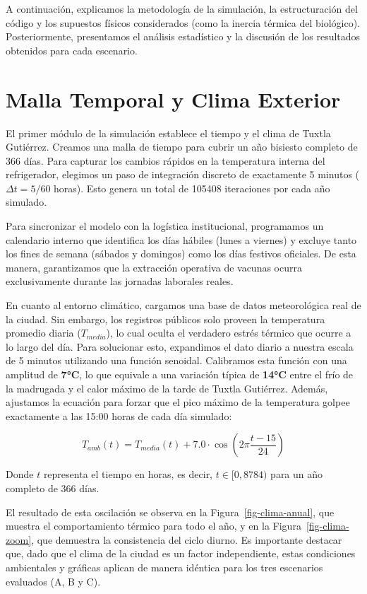 \documentclass[
  spanish,
  letterpaper,
  DIV=11,
  numbers=noendperiod]{scrreprt}
\theoremstyle{plain}
\theoremstyle{plain}
\theoremstyle{plain}
\theoremstyle{definition}
\theoremstyle{remark}
\begin{document}
A continuación, explicamos la metodología de la simulación, la
estructuración del código y los supuestos físicos considerados (como la
inercia térmica del biológico). Posteriormente, presentamos el análisis
estadístico y la discusión de los resultados obtenidos para cada
escenario.

\section{Malla Temporal y Clima
Exterior}\label{malla-temporal-y-clima-exterior}

El primer módulo de la simulación establece el tiempo y el clima de
Tuxtla Gutiérrez. Creamos una malla de tiempo para cubrir un año
bisiesto completo de 366 días. Para capturar los cambios rápidos en la
temperatura interna del refrigerador, elegimos un paso de integración
discreto de exactamente 5 minutos (\(\Delta t = 5/60\) horas). Esto
genera un total de 105408 iteraciones por cada año simulado.

Para sincronizar el modelo con la logística institucional, programamos
un calendario interno que identifica los días hábiles (lunes a viernes)
y excluye tanto los fines de semana (sábados y domingos) como los días
festivos oficiales. De esta manera, garantizamos que la extracción
operativa de vacunas ocurra exclusivamente durante las jornadas
laborales reales.

En cuanto al entorno climático, cargamos una base de datos meteorológica
real de la ciudad. Sin embargo, los registros públicos solo proveen la
temperatura promedio diaria (\(T_{media}\)), lo cual oculta el verdadero
estrés térmico que ocurre a lo largo del día. Para solucionar esto,
expandimos el dato diario a nuestra escala de 5 minutos utilizando una
función senoidal. Calibramos esta función con una amplitud de
\textbf{7°C}, lo que equivale a una variación típica de \textbf{14°C}
entre el frío de la madrugada y el calor máximo de la tarde de Tuxtla
Gutiérrez. Además, ajustamos la ecuación para forzar que el pico máximo
de la temperatura golpee exactamente a las 15:00 horas de cada día
simulado:

\[T_{amb}(t) = T_{media}(t) + 7.0 \cdot \cos\left(2\pi \frac{t - 15}{24}\right)\]

Donde \(t\) representa el tiempo en horas, es decir, \(t \in [0, 8784)\)
para un año completo de 366 días.

El resultado de esta oscilación se observa en la
Figura~\ref{fig-clima-anual}, que muestra el comportamiento térmico para
todo el año, y en la Figura~\ref{fig-clima-zoom}, que demuestra la
consistencia del ciclo diurno. Es importante destacar que, dado que el
clima de la ciudad es un factor independiente, estas condiciones
ambientales y gráficas aplican de manera idéntica para los tres
escenarios evaluados (A, B y C).
\end{document}
